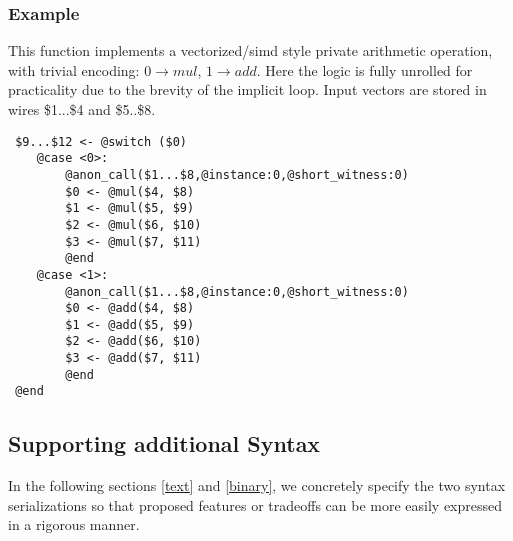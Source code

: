 \subsubsection*{Example}
This function implements a vectorized/simd style private arithmetic operation, with trivial encoding: $0 \rightarrow mul$, $1 \rightarrow add$. Here the logic is fully unrolled for practicality due to the brevity of the implicit loop. Input vectors are stored in wires \$1...\$4 and \$5..\$8.\\

\begin{lstlisting}
 $9...$12 <- @switch ($0)
    @case <0>:
        @anon_call($1...$8,@instance:0,@short_witness:0)
        $0 <- @mul($4, $8)
        $1 <- @mul($5, $9)
        $2 <- @mul($6, $10)
        $3 <- @mul($7, $11)
        @end
    @case <1>:
        @anon_call($1...$8,@instance:0,@short_witness:0)
        $0 <- @add($4, $8)
        $1 <- @add($5, $9)
        $2 <- @add($6, $10)
        $3 <- @add($7, $11)
        @end
 @end
\end{lstlisting}

\subsection{Supporting additional Syntax}

In the following sections \ref{text} and \ref{binary}, we concretely specify the two syntax serializations so that proposed features or tradeoffs can be more easily expressed in a rigorous manner.
